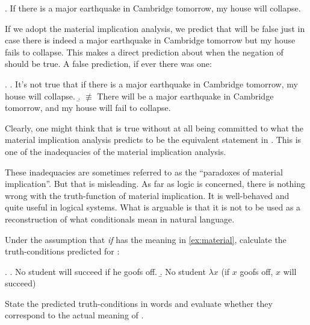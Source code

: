 \ex. \label{earthquake}If there is a major earthquake in Cambridge tomorrow, my house will collapse.

If we adopt the material implication analysis, we predict that \Last will be false just in case there is indeed a major earthquake in Cambridge tomorrow but my house fails to collapse. This makes a direct prediction about when the negation of \Last should be true. A false prediction, if ever there was one:

\ex. \a. \label{neg-earthquake}It's not true that if there is a major earthquake in Cambridge tomorrow, my house will collapse. 
\b. $\not\equiv$ There will be a major earthquake in Cambridge tomorrow, and my house will fail to collapse.

Clearly, one might think that \Last[a] is true without at all being committed to what the material implication analysis predicts to be the equivalent statement in \Last[b]. This is one of the inadequacies of the material implication analysis.

These inadequacies are sometimes referred to as the ``paradoxes of material implication''. But that is misleading. As far as logic is concerned, there is nothing wrong with the truth-function of material implication. It is well-behaved and quite useful in logical systems. What is arguable is that it is not to be used as a reconstruction of what conditionals mean in natural language.

\begin{exercise}
  Under the assumption that \emph{if} has the meaning in \ref{ex:material}, calculate the truth-conditions predicted for \Next:

\ex. \a. No student will succeed if he goofs off.
\b. No student $\lambda x$ (if $x$ goofs off, $x$ will succeed)

State the predicted truth-conditions in words and evaluate whether they correspond to the actual meaning of \Last.
\eex
\end{exercise}



